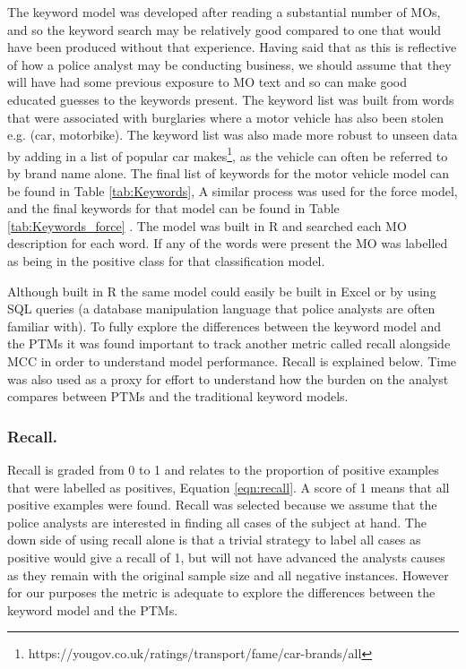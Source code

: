 The keyword model was developed after reading a substantial number of MOs, and so the keyword search may be relatively good compared to one that would have been produced without that experience. Having said that as this is reflective of how a police analyst may be conducting business, we should assume that they will have had some previous exposure to MO text and so can make good educated guesses to the keywords present. The keyword list was built from words that were associated with burglaries where a motor vehicle has also been stolen e.g. (car, motorbike). The keyword list was also made more robust to unseen data by adding in a list of popular car makes\footnote{https://yougov.co.uk/ratings/transport/fame/car-brands/all}, as the vehicle can often be referred to by brand name alone. The final list of keywords for the motor vehicle model can be found in Table \ref{tab:Keywords}, A similar process was used for the force model, and the final keywords for that model can be found in Table \ref{tab:Keywords_force} . The model was built in R and searched each MO description for each word. If any of the words were present the MO was labelled as being in the positive class for that classification model.

Although built in R the same model could easily be built in Excel or by using SQL queries (a database manipulation language that police analysts are often familiar with). To fully explore the differences between the keyword model and the PTMs it was found important to track another metric called recall alongside MCC in order to understand model performance. Recall is explained below. Time was also used as a proxy for effort to understand how the burden on the analyst compares between PTMs and the traditional keyword models.

\subsubsection{Recall.} Recall is graded from 0 to 1 and relates to the proportion of positive examples that were labelled as positives, Equation \ref{eqn:recall}. A score of 1 means that all positive examples were found. Recall was selected because we assume that the police analysts are interested in finding all cases of the subject at hand. The down side of using recall alone is that a trivial strategy to label all cases as positive would give a recall of 1, but will not have advanced the analysts causes as they remain with the original sample size and all negative instances. However for our purposes the metric is adequate to explore the differences between the keyword model and the PTMs.

